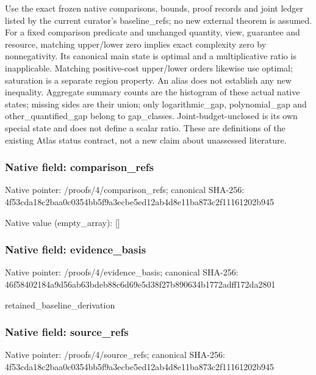 \documentclass[10pt,a4paper]{article}
\begin{document}
\begingroup\raggedright\sloppy Use the exact frozen native comparisons,\allowbreak{} bounds,\allowbreak{} proof records and joint ledger listed by the current curator's baseline\_\allowbreak{}refs;\allowbreak{} no new external theorem is assumed. For a fixed comparison predicate and unchanged quantity,\allowbreak{} view,\allowbreak{} guarantee and resource,\allowbreak{} matching upper/\allowbreak{}lower zero implies exact complexity zero by nonnegativity. Its canonical main state is optimal and a multiplicative ratio is inapplicable. Matching positive-cost upper/\allowbreak{}lower orders likewise use optimal;\allowbreak{} saturation is a separate region property. An alias does not establish any new inequality. Aggregate summary counts are the histogram of these actual native states;\allowbreak{} missing sides are their union;\allowbreak{} only logarithmic\_\allowbreak{}gap,\allowbreak{} polynomial\_\allowbreak{}gap and other\_\allowbreak{}quantified\_\allowbreak{}gap belong to gap\_\allowbreak{}classes. Joint-budget-unclosed is its own special state and does not define a scalar ratio. These are definitions of the existing Atlas status contract,\allowbreak{} not a new claim about unassessed literature. \par\endgroup

\subsubsection{Native field: comparison\_\allowbreak{}refs}
Native pointer: /proofs/4/comparison\_\allowbreak{}refs; canonical SHA-256: 4f53cda18c2baa0c0354bb5f9a3ecbe5ed12ab4d8e11ba873c2f11161202b945

Native value (empty\_\allowbreak{}array): []

\subsubsection{Native field: evidence\_\allowbreak{}basis}
Native pointer: /proofs/4/evidence\_\allowbreak{}basis; canonical SHA-256: 46f58402184a9d56ab63bdeb88c6d69e5d38f27b890634b1772adff172da2801

\begingroup\raggedright\sloppy retained\_\allowbreak{}baseline\_\allowbreak{}derivation\par\endgroup

\subsubsection{Native field: source\_\allowbreak{}refs}
Native pointer: /proofs/4/source\_\allowbreak{}refs; canonical SHA-256: 4f53cda18c2baa0c0354bb5f9a3ecbe5ed12ab4d8e11ba873c2f11161202b945
\end{document}
